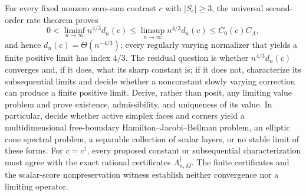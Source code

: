 For every fixed nonzero zero-sum contrast \(c\) with \(|S_c|\geq3\), the universal second-order rate theorem proves
\[
 0<\liminf_{n\to\infty}n^{4/3}d_n(c)
 \leq\limsup_{n\to\infty}n^{4/3}d_n(c)
 \leq C_0(c)C_A,
\]
and hence \(d_n(c)=\Theta(n^{-4/3})\); every regularly varying normalizer that yields a finite positive limit has index \(4/3\). The residual question is whether \(n^{4/3}d_n(c)\) converges and, if it does, what its sharp constant is; if it does not, characterize its subsequential limits and decide whether a nonconstant slowly varying correction can produce a finite positive limit. Derive, rather than posit, any limiting value problem and prove existence, admissibility, and uniqueness of its value. In particular, decide whether active simplex faces and corners yield a multidimensional free-boundary Hamilton--Jacobi--Bellman problem, an elliptic cone spectral problem, a separable collection of scalar layers, or no stable limit of these forms. For \(c=c^\dagger\), every proposed constant or subsequential characterization must agree with the exact rational certificates \(\Lambda_{n,M}^\dagger\). The finite certificates and the scalar-score nonpreservation witness establish neither convergence nor a limiting operator.